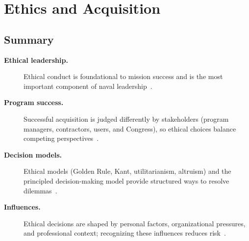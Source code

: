 \documentclass[../main.tex]{subfiles}
\begin{document}
\section{Ethics and Acquisition}

\subsection{Summary}
\begin{description}
  \item[\textbf{Ethical leadership.}] Ethical conduct is foundational to mission success and is the most important component of naval leadership~\autocite{edo-5-1-3-ethics-and-acquisition-2025}.
  \item[\textbf{Program success.}] Successful acquisition is judged differently by stakeholders (program managers, contractors, users, and Congress), so ethical choices balance competing perspectives~\autocite{edo-5-1-3-ethics-and-acquisition-2025}.
  \item[\textbf{Decision models.}] Ethical models (Golden Rule, Kant, utilitarianism, altruism) and the principled decision-making model provide structured ways to resolve dilemmas~\autocite{edo-5-1-3-ethics-and-acquisition-2025}.
  \item[\textbf{Influences.}] Ethical decisions are shaped by personal factors, organizational pressures, and professional context; recognizing these influences reduces risk~\autocite{edo-5-1-3-ethics-and-acquisition-2025}.
\end{description}
\end{document}
